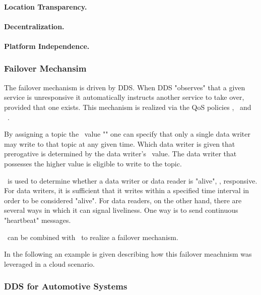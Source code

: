 \paragraph{Location Transparency.}

\paragraph{Decentralization.}

\paragraph{Platform Independence.}


\subsubsection{Failover Mechansim}

The failover mechanism is driven by DDS. When DDS "observes" that a given service is unresponsive it automatically instructs another service to take over, provided that one exists. This mechanism is realized via the QoS policies \ownership , \ostrength\ and \liveliness\ . 

By assigning a topic the \ownership\ value "" one can specify that only a single data writer may write to that topic at any given time. Which data writer is given that prerogative is determined by the data writer's \ostrength\ value. The data writer that possesses the higher value is eligible to write to the topic.

\liveliness\ is used to determine whether a data writer or data reader is "alive", \ie , responsive. For data writers, it is sufficient that it writes within a specified time interval in order to be considered "alive". For data readers, on the other hand, there are several ways in which it can signal liveliness. One way is to send continuous "heartbeat" messages.

\ownership\ can be combined with \liveliness\ to realize a failover mechanism.

In the following an example is given describing how this failover meachnism was leveraged in a cloud scenario.


\subsubsection{DDS for Automotive Systems}

